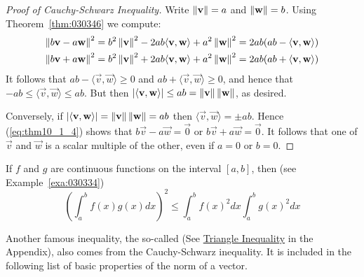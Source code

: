 \documentclass{ximera}
\begin{document}
\begin{proof}[Proof of Cauchy-Schwarz Inequality]
Write $\left\lVert\mathbf{v}\right\rVert = a$ and $\left\lVert\mathbf{w}\right\rVert = b$. Using Theorem~\ref{thm:030346} we compute:
\begin{equation}\label{eq:thm10_1_4}
\begin{split}
	\left\lVert b\mathbf{v} - a \mathbf{w} \right\rVert^2 &= b^2 \left\lVert \mathbf{v} \right\rVert^2 - 2ab \langle \mathbf{v}, \mathbf{w} \rangle + a^2\left\lVert \mathbf{w} \right\rVert^2 = 2ab(ab - \langle \mathbf{v}, \mathbf{w} \rangle) \\
	\left\lVert b\mathbf{v} + a \mathbf{w} \right\rVert^2 &= b^2 \left\lVert \mathbf{v} \right\rVert^2 + 2ab \langle \mathbf{v}, \mathbf{w} \rangle + a^2\left\lVert \mathbf{w} \right\rVert^2 = 2ab(ab + \langle \mathbf{v}, \mathbf{w} \rangle) \\
\end{split}
\end{equation}
It follows that $ab - \langle\vec{v}, \vec{w}\rangle \geq 0$ and
$ab + \langle\vec{v}, \vec{w}\rangle \geq 0$, and hence that $-ab \leq \langle\vec{v}, \vec{w}\rangle \leq ab$. But then $| \langle\mathbf{v}, \mathbf{w}\rangle | \leq ab = \left\lVert\mathbf{v}\right\rVert \left\lVert \mathbf{w}\right\rVert$, as desired.

Conversely, if $|\langle \mathbf{v},  \mathbf{w}\rangle | =
\left\lVert\mathbf{v}\right\rVert \left\lVert \mathbf{w} \right\rVert = ab$
then $\langle\vec{v}, \vec{w}\rangle = \pm ab$. Hence (\ref{eq:thm10_1_4}) shows that $b\vec{v} - a\vec{w} = \vec{0}$ or $b\vec{v} + a\vec{w} = \vec{0}$. It follows that one of $\vec{v}$ and $\vec{w}$ is a scalar multiple of the other, even if $a = 0$ or $b = 0$.
\end{proof}

\begin{example}\label{exa:030499}
If $f$ and $g$ are continuous functions on the interval $[a, b]$, then (see Example~\ref{exa:030334})
\begin{equation*}
\left(\int_{a}^{b} f(x)g(x)dx \right) ^2 \leq \int_{a}^{b} f(x)^2 dx \int_{a}^{b} g(x)^2 dx
\end{equation*}
\end{example}

Another famous inequality, the so-called  (See \href{https://ximera.osu.edu/linearalgebradzv3/LinearAlgebraInteractiveIntro/APX-0010/main}{Triangle Inequality} in the Appendix), also comes from the Cauchy-Schwarz inequality. It is included in the following list of basic properties of the norm of a vector.
\end{document}
